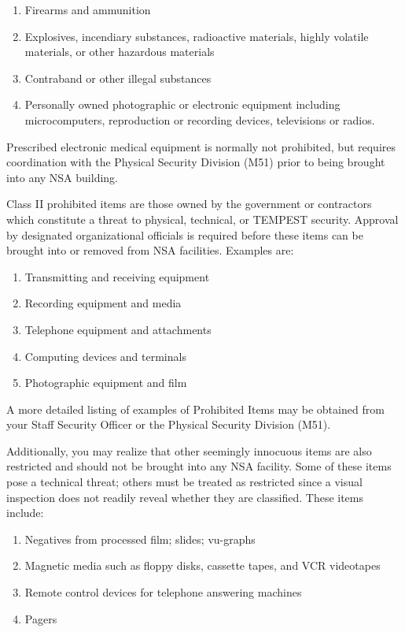 \documentclass[a4]{article}
\begin{document}
\begin{enumerate}
\item Firearms and ammunition
\item Explosives, incendiary substances, radioactive materials, highly 
volatile materials, or other hazardous materials
\item Contraband or other illegal substances
\item Personally owned photographic or electronic equipment including
microcomputers, reproduction or recording devices, televisions or radios.
\end{enumerate}

Prescribed electronic medical equipment is normally not prohibited, but
requires coordination with the Physical Security Division (M51) prior to being
brought into any NSA building.

Class II prohibited items are those owned by the government or contractors
which constitute a threat to physical, technical, or TEMPEST security.
Approval by designated organizational officials is required before these items
can be brought into or removed from NSA facilities.  Examples are:

\begin{enumerate}
\item Transmitting and receiving equipment
\item Recording equipment and media
\item Telephone equipment and attachments
\item Computing devices and terminals
\item Photographic equipment and film
\end{enumerate}

A more detailed listing of examples of Prohibited Items may be obtained from
your Staff Security Officer or the Physical Security Division (M51).

Additionally, you may realize that other seemingly innocuous items are also
restricted and should not be brought into any NSA facility.  Some of these
items pose a technical threat; others must be treated as restricted since a
visual inspection does not readily reveal whether they are classified.  These
items include:

\begin{enumerate}
\item Negatives from processed film; slides; vu-graphs
\item Magnetic media such as floppy disks, cassette tapes, and VCR videotapes
\item Remote control devices for telephone answering machines
\item Pagers
\end{enumerate}
\end{document}
